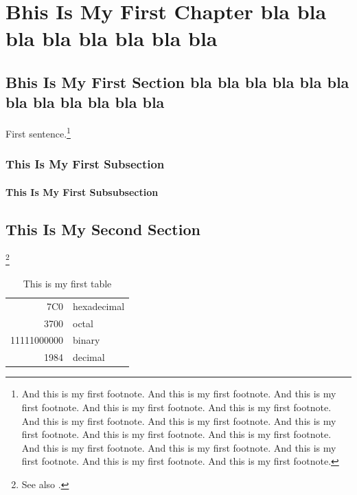 % 

\chapter{Bhis Is My First Chapter bla bla bla bla bla bla bla bla}
\section{Bhis Is My First Section bla bla bla bla bla bla bla bla bla bla bla bla }
\noindent
First sentence.\footnote{And this is my first footnote. And this is my first footnote. And this is my first footnote. And this is my first footnote. And this is my first footnote. And this is my first footnote. And this is my first footnote. And this is my first footnote. And this is my first footnote. And this is my first footnote. And this is my first footnote. And this is my first footnote. And this is my first footnote. And this is my first footnote. And this is my first footnote.}

\subsection{This Is My First Subsection}
\noindent
\cite{texbook} 
\subsubsection{This Is My First Subsubsection}











\section{This Is My Second Section}
\noindent
\footnote{See also \cite{Aup91,Dou72,Hal82}.}








\begin{table}[h]
  \begin{center}
\begin{tabular}{|r|l|}
  \hline
  7C0 & hexadecimal \\
  3700 & octal \\ \cline{2-2}
  11111000000 & binary \\
  \hline \hline
  1984 & decimal \\
  \hline
\end{tabular}
\caption{This is my first table}
\end{center}
\end{table}

